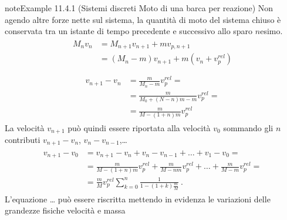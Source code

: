 \documentclass[letterpaper,10pt,italian]{jupyterBook}
\begin{document}
\begin{sphinxadmonition}{note}{Example 11.4.1 (Sistemi discreti \sphinxhyphen{} Moto di una barca per reazione)}
\sphinxAtStartPar
Non agendo altre forze nette sul sistema, la quantità di moto del sistema chiuso è conservata tra un istante di tempo precedente e successivo allo sparo \(n\)\sphinxhyphen{}esimo.
\begin{equation*}
\begin{split}\begin{aligned}
  M_{n} v_{n} 
  & = M_{n+1} v_{n+1} + m v_{p,n+1} \\
  & = ( M_{n} - m ) v_{n+1} + m ( v_{n} + v_p^{rel} ) \\
\end{aligned}\end{split}
\end{equation*}\begin{equation*}
\begin{split}\begin{aligned}
  v_{n+1} - v_n & = \frac{m}{M_n - m} v_p^{rel} = \\
  & = \frac{m}{M_0 + (N-n)m - m} v_p^{rel} = \\
  & = \frac{m}{M - (1+n) m} v_p^{rel}
\end{aligned}\end{split}
\end{equation*}
\sphinxAtStartPar
La velocità \(v_{n+1}\) può quindi essere riportata alla velocità \(v_0\) sommando gli \(n\) contributi \(v_{n+1} - v_{n}\), \(v_{n} - v_{n-1}\),…
\begin{equation*}
\begin{split}\begin{aligned}
  v_{n+1} - v_0 & = v_{n+1} - v_n + v_n - v_{n-1} + \dots + v_1 - v_0 = \\
  & = \frac{m}{M - (1+n) m} v_p^{rel} +  \frac{m}{M - n m} v_p^{rel} + \dots + \frac{m}{M-m} v^{rel}_p = \\
  & = \frac{m}{M} v_p^{rel} \sum_{k = 0}^{n} \frac{1}{1 - (1+k) \frac{m}{M}} \ .
\end{aligned}\end{split}
\end{equation*}
\sphinxAtStartPar
{} L’equazione … può essere riscritta mettendo in evidenza le variazioni delle grandezze fisiche velocità e massa


\end{sphinxadmonition}
\end{document}
